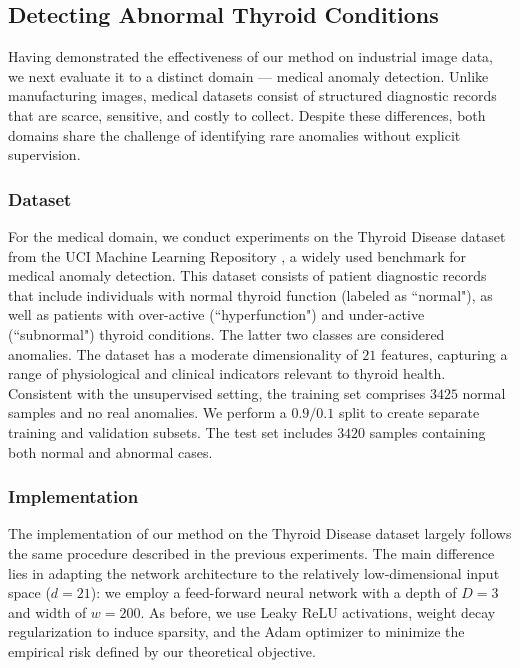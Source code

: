 \documentclass{article}
\begin{document}
\subsection{Detecting Abnormal Thyroid Conditions}
Having demonstrated the effectiveness of our method on industrial image data, we next evaluate it to a distinct domain --- medical anomaly detection. Unlike manufacturing images, medical datasets consist of structured diagnostic records that are scarce, sensitive, and costly to collect. Despite these differences, both domains share the challenge of identifying rare anomalies without explicit supervision.
\subsubsection{Dataset}
For the medical domain, we conduct experiments on the Thyroid Disease dataset from the UCI Machine Learning Repository \citep{thyroid_dataset}, a widely used benchmark for medical anomaly detection. This dataset consists of patient diagnostic records that include individuals with normal thyroid function (labeled as ``normal"),  as well as patients with over-active (``hyperfunction") and under-active (``subnormal") thyroid conditions. The latter two classes are considered anomalies. The dataset has a moderate dimensionality of $21$ features, capturing a range of physiological and clinical indicators relevant to thyroid health. Consistent with the unsupervised setting, the training set comprises $3425$ normal samples and no real anomalies. We perform a $0.9/0.1$ split to create separate training and validation subsets. The test set includes $3420$ samples containing both normal and abnormal cases.

\subsubsection{Implementation}
The implementation of our method on the Thyroid Disease dataset largely follows the same procedure described in the previous experiments. The main difference lies in adapting the network architecture to the relatively low-dimensional input space ($d = 21$): we employ a feed-forward neural network with a depth of $D = 3$ and width of $w = 200$. As before, we use Leaky ReLU activations, weight decay regularization to induce sparsity, and the Adam optimizer to minimize the empirical risk defined by our theoretical objective.
\end{document}
